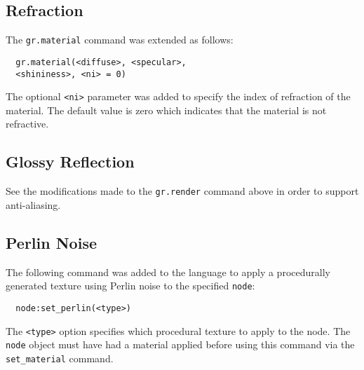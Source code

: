 \subsection*{Refraction}
The \verb|gr.material| command was extended as follows:
\begin{lstlisting}
  gr.material(<diffuse>, <specular>, 
  <shininess>, <ni> = 0)
\end{lstlisting}
The optional \verb|<ni>| parameter was added to specify the index of refraction
of the material. The default value is zero which indicates that the material is
not refractive.

\subsection*{Glossy Reflection}
See the modifications made to the \verb|gr.render| command above in order to
support anti-aliasing.

\subsection*{Perlin Noise}
The following command was added to the language to apply a procedurally
generated texture using Perlin noise to the specified \verb|node|:
\begin{lstlisting}
  node:set_perlin(<type>)
\end{lstlisting}
The \verb|<type>| option specifies which procedural texture to apply to the
node. The \verb|node| object must have had a material applied before using this
command via the \verb|set_material| command.

